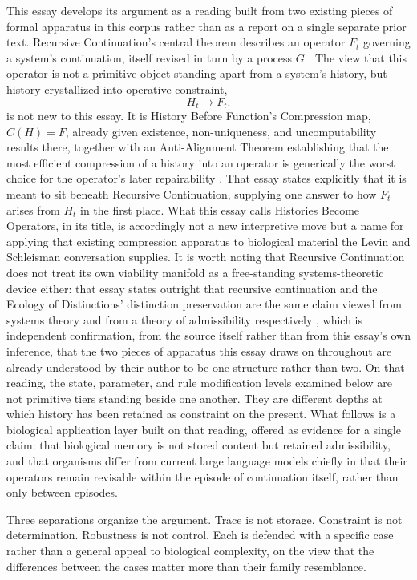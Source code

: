 \documentclass[11pt]{article}
\begin{document}
This essay develops its argument as a reading built from two existing pieces of formal apparatus in this corpus rather than as a report on a single separate prior text. Recursive Continuation's central theorem describes an operator $F_t$ governing a system's continuation, itself revised in turn by a process $G$ \cite{recursivecontinuation}. The view that this operator is not a primitive object standing apart from a system's history, but history crystallized into operative constraint,
\[
H_t \longrightarrow F_t.
\]
is not new to this essay. It is History Before Function's Compression map, $C(H) = F$, already given existence, non-uniqueness, and uncomputability results there, together with an Anti-Alignment Theorem establishing that the most efficient compression of a history into an operator is generically the worst choice for the operator's later repairability \cite{historybeforefunction}. That essay states explicitly that it is meant to sit beneath Recursive Continuation, supplying one answer to how $F_t$ arises from $H_t$ in the first place. What this essay calls Histories Become Operators, in its title, is accordingly not a new interpretive move but a name for applying that existing compression apparatus to biological material the Levin and Schleisman conversation supplies. It is worth noting that Recursive Continuation does not treat its own viability manifold as a free-standing systems-theoretic device either: that essay states outright that recursive continuation and the Ecology of Distinctions' distinction preservation are the same claim viewed from systems theory and from a theory of admissibility respectively \cite{recursivecontinuation}, which is independent confirmation, from the source itself rather than from this essay's own inference, that the two pieces of apparatus this essay draws on throughout are already understood by their author to be one structure rather than two. On that reading, the state, parameter, and rule modification levels examined below are not primitive tiers standing beside one another. They are different depths at which history has been retained as constraint on the present. What follows is a biological application layer built on that reading, offered as evidence for a single claim: that biological memory is not stored content but retained admissibility, and that organisms differ from current large language models chiefly in that their operators remain revisable within the episode of continuation itself, rather than only between episodes.

Three separations organize the argument. Trace is not storage. Constraint is not determination. Robustness is not control. Each is defended with a specific case rather than a general appeal to biological complexity, on the view that the differences between the cases matter more than their family resemblance.
\end{document}
